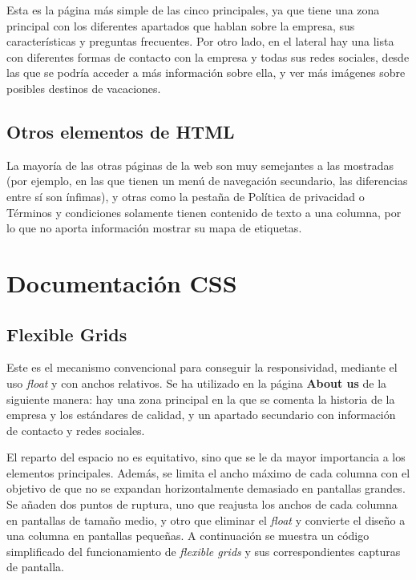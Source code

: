 \documentclass[11pt, a4paper]{book}
\begin{document}
	Esta es la página más simple de las cinco principales, ya que tiene una zona principal con los diferentes apartados que hablan sobre la empresa, sus características y preguntas frecuentes. Por otro lado, en el lateral hay una lista con diferentes formas de contacto con la empresa y todas sus redes sociales, desde las que se podría acceder a más información sobre ella, y ver más imágenes sobre posibles destinos de vacaciones.
	
	\section{Otros elementos de HTML}
	
	La mayoría de las otras páginas de la web son muy semejantes a las mostradas (por ejemplo, en las que tienen un menú de navegación secundario, las diferencias entre sí son ínfimas), y otras como la pestaña de Política de privacidad o Términos y condiciones solamente tienen contenido de texto a una columna, por lo que no aporta información mostrar su mapa de etiquetas.
	
	
	
	
	
	
	
	\chapter{Documentación CSS}
	
	\section{Flexible Grids}
	Este es el mecanismo convencional para conseguir la responsividad, mediante el uso \textit{float} y con anchos relativos. Se ha utilizado en la página \textbf{About us} de la siguiente manera: hay una zona principal en la que se comenta la historia de la empresa y los estándares de calidad, y un apartado secundario con información de contacto y redes sociales.
	
	El reparto del espacio no es equitativo, sino que se le da mayor importancia a los elementos principales. Además, se limita el ancho máximo de cada columna con el objetivo de que no se expandan horizontalmente demasiado en pantallas grandes. Se añaden dos puntos de ruptura, uno que reajusta los anchos de cada columna en pantallas de tamaño medio, y otro que eliminar el \textit{float} y convierte el diseño a una columna en pantallas pequeñas. A continuación se muestra un código simplificado del funcionamiento de \textit{flexible grids} y sus correspondientes capturas de pantalla.
	
\end{document}
